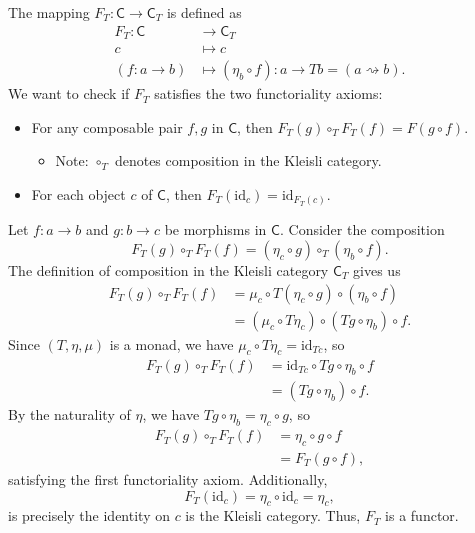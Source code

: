 \documentclass[12pt]{article}
\newcommand{\C}{\mathsf{C}}
\newcommand{\id}[1]{\text{id}_{#1}}
\begin{document}
The mapping $F_T:\C\rightarrow\C_T$ is defined as
\begin{align*}
    F_T:\C              &\rightarrow\C_T \\
        c               &\mapsto    c \\
    (f:a\rightarrow b)    &\mapsto    (\eta_b\circ f):a\rightarrow Tb = (a\rightsquigarrow b).
\end{align*}
We want to check if $F_T$ satisfies the two functoriality axioms:
\begin{itemize}
    \item For any composable pair $f,g$ in $\C$, then $F_T(g)\circ_T F_T(f) = F(g\circ f)$. 
    \begin{itemize}
        \item Note: $\circ_T$ denotes composition in the Kleisli category.
    \end{itemize}
    \item For each object $c$ of $\C$, then $F_T(\id{c}) = \id{F_T(c)}$.
\end{itemize}
Let $f:a\rightarrow b$ and $g:b\rightarrow c$ be morphisms in $\C$. Consider the composition
\[F_T(g) \circ_T F_T(f) = (\eta_c \circ g) \circ_T (\eta_b \circ f).\]
The definition of composition in the Kleisli category $\C_T$ gives us
\begin{align*}
    F_T(g) \circ_T F_T(f)   
        &= \mu_c \circ T(\eta_c \circ g) \circ (\eta_b \circ f) \\
        &= (\mu_c \circ T\eta_c) \circ (Tg \circ \eta_b) \circ f.
\end{align*}
Since $(T,\eta,\mu)$ is a monad, we have $\mu_c\circ T\eta_c = \id{Tc}$, so
\begin{align*}
    F_T(g) \circ_T F_T(f)   
        &= \id{Tc} \circ Tg \circ \eta_b \circ f \\
        &= (Tg \circ \eta_b) \circ f.
\end{align*}
By the naturality of $\eta$, we have $Tg\circ\eta_b = \eta_c\circ g$, so
\begin{align*}
    F_T(g) \circ_T F_T(f)   
        &= \eta_c\circ g \circ f \\
        &= F_T(g\circ f),
\end{align*}
satisfying the first functoriality axiom. Additionally,
\[F_T(\id{c}) = \eta_c\circ\id{c} = \eta_c,\]
is precisely the identity on $c$ is the Kleisli category. Thus, $F_T$ is a functor.
\end{document}
